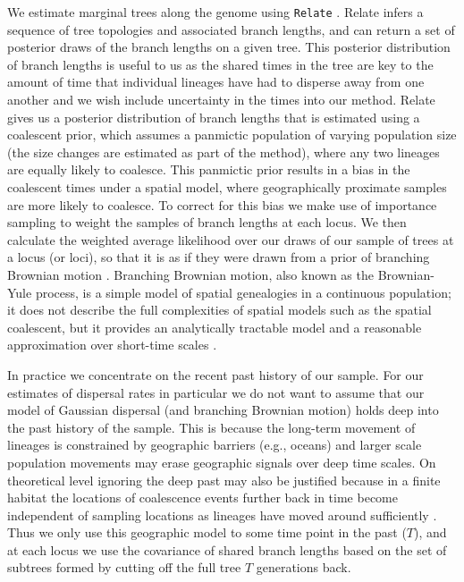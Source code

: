\documentclass[12pt]{article}
\begin{document}
We estimate marginal trees along the genome using \texttt{Relate} \citep{speidel2019method}. 
Relate infers a sequence of tree topologies and associated branch lengths, and can return a set of posterior draws of the branch lengths on a given tree. 
This posterior distribution of branch lengths is useful to us as the shared times in the tree are key to the amount of time that individual lineages have had to disperse away from one another and we wish include uncertainty in the times into our method. 
Relate gives us a posterior distribution of branch lengths that is estimated using a coalescent prior, which assumes a panmictic population of varying population size (the size changes are estimated as part of the method), where any two lineages are equally likely to coalesce. 
This panmictic prior results in a bias in the coalescent times under a spatial model, where geographically proximate samples are more likely to coalesce. 
To correct for this bias we make use of importance sampling to weight the samples of branch lengths at each locus.  
We then calculate the weighted average likelihood over our draws of our sample of trees at a locus (or loci), so that it is as if they were drawn from a prior of branching Brownian motion \citep{meligkotsidou2007postprocessing}. 
Branching Brownian motion, also known as the Brownian-Yule process, is a simple model of spatial genealogies in a continuous population; it does not describe the full complexities of spatial models such as the spatial coalescent, but it provides an analytically tractable model and a reasonable approximation over short-time scales \citep{edwards1970estimation,rannala1996probability,meligkotsidou2007postprocessing,novembre2009likelihood}.

In practice we concentrate on the recent past history of our sample. 
For our estimates of dispersal rates in particular we do not want to assume that our model of Gaussian dispersal (and branching Brownian motion) holds deep into the past history of the sample. 
This is because the long-term movement of lineages is constrained by geographic barriers (e.g., oceans) and larger scale population movements may erase geographic signals over deep time scales. 
On theoretical level ignoring the deep past may also be justified because in a finite habitat the locations of coalescence events further back in time become independent of sampling locations as lineages have moved around sufficiently \citep{wilkins2002coalescent}. 
Thus we only use this geographic model to some time point in the past ($T$), and at each locus we use the covariance of shared branch lengths based on the set of subtrees formed by cutting off the full tree $T$ generations back. 
\end{document}

